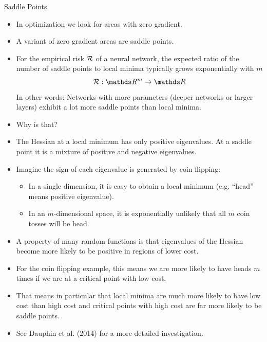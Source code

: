 \documentclass[11pt,compress,t,notes=noshow, xcolor=table]{beamer}
\begin{document}
\begin{vbframe}{Saddle Points}
  \begin{itemize}
    \item In optimization we look for areas with zero gradient.
    \item A variant of zero gradient areas are saddle points.
    \item For the empirical risk $\mathcal{R}$ of a neural network, the expected ratio of the number of saddle points to local minima typically grows exponentially with $m$ 
    $$\risk: \R^m \rightarrow \R$$ 
    In other words: Networks with more parameters (deeper networks or larger layers) exhibit a lot more saddle points than local minima.
     \item Why is that?
    \item The Hessian at a local minimum has only positive eigenvalues. At a saddle point it is a mixture of positive and negative eigenvalues.
    
\framebreak
    
    \item Imagine the sign of each eigenvalue is generated by coin flipping:
    \begin{itemize}
      \item In a single dimension, it is easy to obtain a local minimum (e.g. \enquote{head} means positive eigenvalue).
      \item In an $m$-dimensional space, it is exponentially unlikely that all $m$ coin tosses will be head.
    \end{itemize}
    \item A property of many random functions is that eigenvalues of the Hessian become more likely to be positive in regions of lower cost.
    \item For the coin flipping example, this means we are more likely to have heads $m$ times if we are at a critical point with low cost.
    \item That means in particular that local minima are much more likely to have low cost than high cost and critical points with high cost are far more likely to be saddle points.
    \item See Dauphin et al. (2014) for a more detailed investigation.
    
\framebreak
    

\end{itemize}
\end{vbframe}
\end{document}
